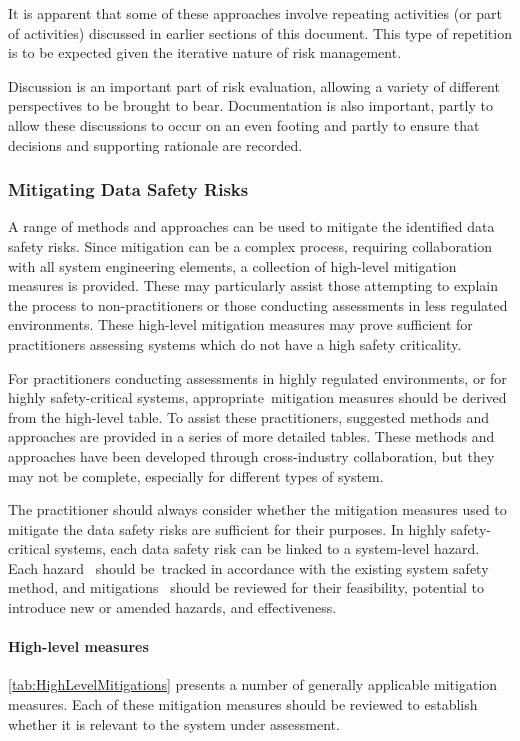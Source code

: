 It is apparent that some of these approaches involve repeating activities (or part of activities) discussed in earlier sections of this document. This type of repetition is to be expected given the iterative nature of risk management.

Discussion is an important part of risk evaluation, allowing a variety of different perspectives to be brought to bear. Documentation is also important, partly to allow these discussions to occur on an even footing and partly to ensure that decisions and supporting rationale are recorded.

\subsubsection{Mitigating Data Safety Risks}
A range of methods and approaches can be used to mitigate the identified data safety risks. Since \gls{mitigation} can be a complex process, requiring collaboration with all system engineering elements, a collection of high-level \gls{mitigation} measures is provided. These may particularly assist those attempting to explain the process to non-practitioners or those conducting assessments in less regulated environments. \cbstart These high-level \gls{mitigation} measures may prove sufficient for practitioners assessing systems which do not have a high safety criticality\cbend.

For practitioners conducting assessments in highly regulated environments, or for highly safety-critical systems, \cbstart appropriate\cbend\ \gls{mitigation} measures should be derived from the high-level table. To assist these practitioners, suggested methods and approaches are provided in a series of more detailed tables. These methods and approaches have been developed through cross-industry collaboration, but they may not be complete, especially for different types of system. 

The practitioner should always consider whether the \gls{mitigation} measures used to mitigate the data safety risks are sufficient for their purposes. In highly safety-critical systems, each data safety risk can be linked to a system-level \cbstart hazard\cbend. Each hazard \cbstart\ should be\cbend\ tracked in accordance with the existing system safety method, and \glspl{mitigation} \cbstart\ should be reviewed for their feasibility, potential to introduce new or amended hazards, and effectiveness\cbend.

\paragraph{High-level  measures}
\autoref{tab:HighLevelMitigations} presents a number of generally applicable \gls{mitigation} measures.
Each of these \gls{mitigation} measures should be reviewed to establish whether it is relevant to the system under assessment.

